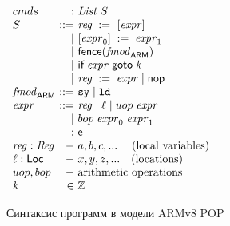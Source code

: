 \begin{figure}
  \begin{center}
$\begin{array}{l @{~} r @{~} l}
\Carm    & : & \ListOf{\StmtARM} \\  
\StmtARM & ::= & \readInst{\reg}{\expr} \\
         & |   & \writeInst{\expr_0}{\expr_1} \\
         & |   & \fenceInst{\Ftype} \\
         & |   & \ifGotoInst{\expr}{\z} \\
         & |   & \assignInst{\reg}{\expr} \mid \nop \\
\Ftype   & ::= & \SY \mid \LD\\
\expr    & ::= & \reg \mid \loc \mid uop \; \expr \\
         & |   & bop \; \expr_0 \; \expr_1 \\
         & :   & \Expr \\
\reg : \Reg & - & a, b, c, ...  \quad \; \text{(local variables)} \\
\loc : \Loc & - & x, y, z, ... \quad \text{(locations)} \\
uop, bop & - & \text{arithmetic operations} \\
\z       & \in & \mathbb{Z}
\end{array}$
  \end{center}
\caption{Синтаксис программ в модели ARMv8 POP}
\label{fig:syn-arm}
\end{figure}

